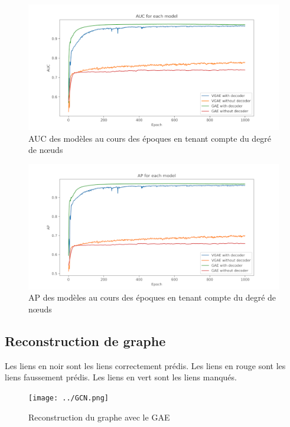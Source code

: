 \documentclass{article}
\begin{document}
\begin{figure}[H]
    \centering
    \includegraphics[width=1\linewidth]{../test_performance/avec_degre_0dropout/AUC.png}
    \caption{AUC des modèles au cours des époques en tenant compte du degré de nœuds}
    \label{fig:fig_AUC_avec_degre}
\end{figure}

\begin{figure}[H]
    \centering
    \includegraphics[width=1\linewidth]{../test_performance/avec_degre_0dropout/AP.png}
    \caption{AP des modèles au cours des époques en tenant compte du degré de nœuds}
    \label{fig:fig_AP_avec_degre}
\end{figure}

\subsection{Reconstruction de graphe}

Les liens en noir sont les liens correctement prédis.\newline
Les liens en rouge sont les liens faussement prédis.\newline
Les liens en vert sont les liens manqués.

\begin{figure}[H]
    \centering
    \texttt{[image: ../GCN.png]}
    \caption{Reconstruction du graphe avec le GAE}
    \label{fig:fig_graphe_GAE}
\end{figure}
\end{document}
